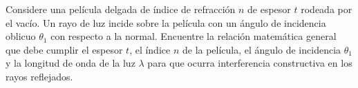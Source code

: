 \item Considere una película delgada de índice de refracción $n$ de espesor $t$ rodeada por el vacío. Un rayo de luz incide sobre la película con un ángulo de incidencia oblicuo $\theta_1$ con respecto a la normal. Encuentre la relación matemática general que debe cumplir el espesor $t$, el índice $n$ de la película, el ángulo de incidencia $\theta_1$ y la longitud de onda de la luz $\lambda$ para que ocurra interferencia constructiva en los rayos reflejados.